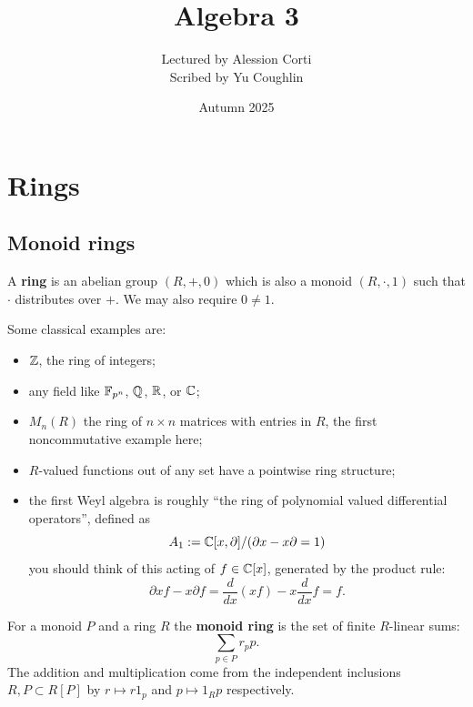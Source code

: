 \documentclass{article}
\begin{document}
\title{Algebra 3}
\author{Lectured by Alession Corti \\
Scribed by Yu Coughlin}
\date{Autumn 2025}

\maketitle

\tableofcontents

\section{Rings}

\subsection{Monoid rings}

\begin{definition}
    A \textbf{ring} is an abelian group $(R,+,0)$ which is also a monoid $(R,\cdot,1)$ such that $\cdot$ distributes over $+$. We may also require $0\neq 1$.
\end{definition}
Some classical examples are: \begin{itemize}
    \item $\mathbb{Z}$, the ring of integers;
    \item any field like $\mathbb{F}_{p^n}$, $\mathbb{Q}$, $\mathbb{R}$, or $\mathbb{C}$;
    \item $M_n(R)$ the ring of $n\times n$ matrices with entries in $R$, the first noncommutative example here;
    \item $R$-valued functions out of any set have a pointwise ring structure;
    \item the first Weyl algebra is roughly ``the ring of polynomial valued differential operators'', defined as \[
        A_1 := \mathbb{C}[x,\partial] / (\partial x - x \partial = 1)
    \] you should think of this acting of $f\in \mathbb{C}[x]$, generated by the product rule: \[
    \partial xf - x\partial f = \frac{d}{dx}(xf) - x\frac{d}{dx}f = f.
    \]
\end{itemize}

\begin{definition}
    For a monoid $P$ and a ring $R$ the \textbf{monoid ring} is the set of finite $R$-linear sums:\[
    \sum_{p\in P}r_p p.
    \] The addition and multiplication come from the independent inclusions $R,P\subset R[P]$ by $r\mapsto r1_p$ and $p \mapsto 1_Rp$ respectively.
\end{definition}
\end{document}
